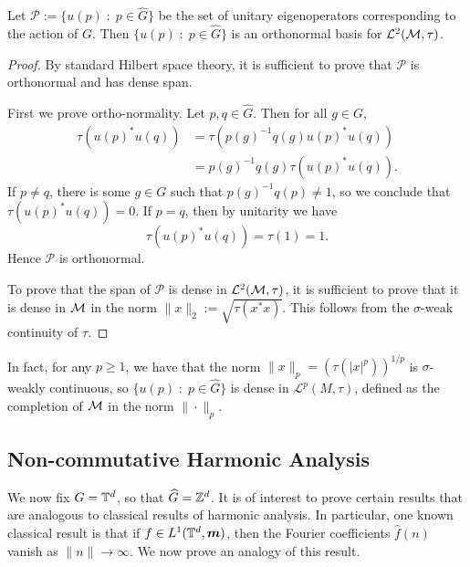 \begin{proposition}
    Let $\mathcal{P} := \{u(p)\;:\;p \in \widehat{G}\}$ be the set of unitary eigenoperators
    corresponding to the action of $G$. Then $\{u(p)\;:\; p \in \widehat{G}\}$
    is an orthonormal basis for $\mathcal{L}^2(\mathcal{M},\tau)$.
\end{proposition}
\begin{proof}
    By standard Hilbert space theory, it is sufficient to prove that $\mathcal{P}$
    is orthonormal and has dense span.
    
    First we prove ortho-normality. Let $p,q \in \widehat{G}$. Then for all $g \in G$,
    \begin{align}
        \tau(u(p)^*u(q)) &= \tau(p(g)^{-1}q(g)u(p)^*u(q))\\
        &= p(g)^{-1}q(g)\tau(u(p)^*u(q)).
    \end{align}
    If $p \neq q$, there is some $g \in G$ such that $p(g)^{-1}q(p) \neq 1$,
    so we conclude that $\tau(u(p)^*u(q)) = 0$.
    If $p = q$, then by unitarity we have
    \begin{equation}
        \tau(u(p)^*u(q)) = \tau(1) = 1.
    \end{equation}
    Hence $\mathcal{P}$ is orthonormal.
    
    To prove that the span of $\mathcal{P}$ is dense in $\mathcal{L}^2(\mathcal{M},\tau)$,
    it is sufficient to prove that it is dense in $\mathcal{M}$ in the norm $\|x\|_2 := \sqrt{\tau(x^*x)}$.
    This follows from the $\sigma$-weak continuity of $\tau$.
\end{proof}

\begin{remark}
    In fact, for any $p \geq 1$, we have that the norm $\|x\|_p = (\tau(|x|^p))^{1/p}$
    is $\sigma$-weakly continuous, so $\{u(p)\;:\;p \in \widehat{G}\}$
    is dense in $\mathcal{L}^p(M,\tau)$, defined as the completion of $\mathcal{M}$
    in the norm $\|\cdot\|_p$. 
\end{remark}


\subsection{Non-commutative Harmonic Analysis}

We now fix $G = \mathbb{T}^d$, so that $\widehat{G} = \mathbb{Z}^d$. It is of interest
to prove certain results that are analogous to classical results of harmonic
analysis. In particular, one known classical result is that if $f \in L^1(\mathbb{T}^d,\boldsymbol{m})$,
then the Fourier coefficients $\hat{f}(n)$ vanish as $\|n\|\rightarrow \infty$. We now
prove an analogy of this result. 

